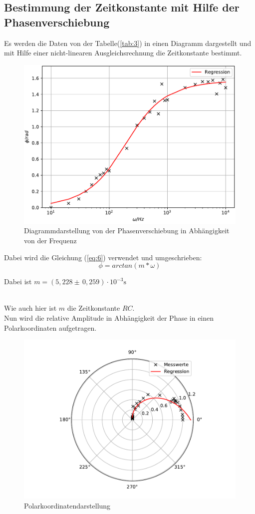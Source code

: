 \subsection{Bestimmung der Zeitkonstante mit Hilfe der Phasenverschiebung}
Es werden die Daten von der Tabelle(\ref{tab:3}) in einen Diagramm dargestellt und mit Hilfe
einer nicht-linearen Ausgleichsrechnung die Zeitkonstante bestimmt.

\begin{figure}[H]
  \centering
  \includegraphics[width=\textwidth]{Diagramm3.pdf}
  \caption{Diagrammdarstellung von der Phasenverschiebung in Abhängigkeit von der Frequenz}
  \label{fig:8}
\end{figure}
Dabei wird die Gleichung (\ref{eq:6}) verwendet und umgeschrieben:
\begin{equation*}
  \phi= arctan(m*\omega)
\end{equation*}
\centerline{Dabei ist $m=(5,228 \pm \, 0,259) \cdot 10^{-3} \si{\second}$} \\
Wie auch hier ist $m$ die Zeitkonstante $RC$.\\
Nun wird die relative Amplitude in Abhängigkeit der Phase in einen Polarkoordinaten aufgetragen.
\begin{figure}[H]
  \centering
  \includegraphics[width=\textwidth]{Polar.pdf}
  \caption{Polarkoordinatendarstellung}
  \label{fig:9}
\end{figure}
